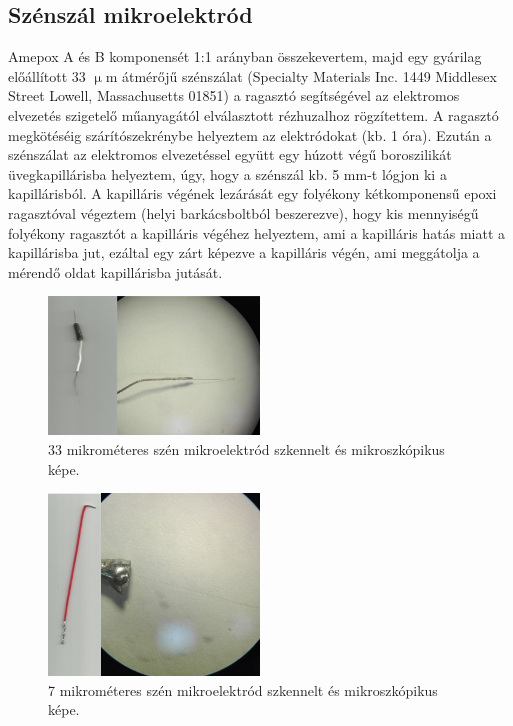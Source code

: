 \subsection{Szénszál mikroelektród}
Amepox A és B komponensét 1:1 arányban összekevertem, majd egy gyárilag előállított 33 $\upmu$m átmérőjű szénszálat (Specialty Materials Inc. 1449 Middlesex Street Lowell, Massachusetts 01851) a ragasztó segítségével az elektromos elvezetés szigetelő műanyagától elválasztott rézhuzalhoz rögzítettem. A ragasztó megkötéséig szárítószekrénybe helyeztem az elektródokat (kb. 1 óra). Ezután a szénszálat az elektromos elvezetéssel együtt egy húzott végű boroszilikát üvegkapillárisba helyeztem, úgy, hogy a szénszál kb. 5 mm-t lógjon ki a kapillárisból. A kapilláris végének lezárását egy folyékony kétkomponensű epoxi ragasztóval végeztem (helyi barkácsboltból beszerezve), hogy kis mennyiségű folyékony ragasztót a kapilláris végéhez helyeztem, ami a kapilláris hatás miatt a kapillárisba jut, ezáltal egy zárt képezve a kapilláris végén, ami meggátolja a mérendő oldat kapillárisba jutását.
\begin{figure}[h]
\centering
\includegraphics[width=0.5\textwidth]{img/szen33.png}
\caption{33 mikrométeres szén mikroelektród szkennelt és mikroszkópikus képe.}
\label{fig:ionophores}
\end{figure}

\begin{figure}[h]
\centering
\includegraphics[width=0.5\textwidth]{img/szenmikro.png}
\caption{7 mikrométeres szén mikroelektród szkennelt és mikroszkópikus képe.}
\label{fig:ionophores}
\end{figure}

